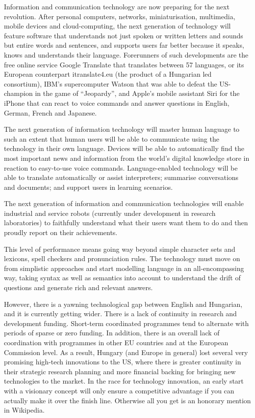 \begin{multicols}{2}
  Information and communication technology are now preparing for the next revolution. After personal computers, networks, miniaturisation, multimedia, mobile devices and cloud-computing, the next generation of technology will feature software that understands not just spoken or written letters and sounds but entire words and sentences, and supports users far better because it speaks, knows and understands their language. Forerunners of such developments are the free online service Google Translate that translates between 57 languages, or its European counterpart itranslate4.eu (the product of a Hungarian led consortium), IBM’s supercomputer Watson that was able to defeat the US-champion in the game of “Jeopardy”, and Apple’s mobile assistant Siri for the iPhone that can react to voice commands and answer questions in English, German, French and Japanese. 

  The next generation of information technology will master human language to such an extent that human users will be able to communicate using the technology in their own language. Devices will be able to automatically find the most important news and information from the world’s digital knowledge store in reaction to easy-to-use voice commands. Language-enabled technology will be able to translate automatically or assist interpreters; summarise conversations and documents;  and support users in learning scenarios. 

  The next generation of information and communication technologies will enable industrial and service robots (currently under development in research laboratories) to faithfully understand what their users want them to do and then proudly report on their achievements.  

  This level of performance means going way beyond simple character sets and lexicons, spell checkers and pronunciation rules. The technology must move on from simplistic approaches and start modelling language in an all-encompassing way, taking syntax as well as semantics into account to understand the drift of questions and generate rich and relevant answers.

  However, there is a yawning technological gap between English and Hungarian, and it is currently getting wider. There is a lack of continuity in research and development funding. Short-term coordinated programmes tend to alternate with periods of sparse or zero funding. In addition, there is an overall lack of coordination with programmes in other EU countries and at the European Commission level. As a result, Hungary (and Europe in general) lost several very promising high-tech innovations to the US, where there is greater continuity in their strategic research planning and more financial backing for bringing new technologies to the market. In the race for technology innovation, an early start with a visionary concept will only ensure a competitive advantage if you can actually make it over the finish line. Otherwise all you get is an honorary mention in Wikipedia.


\end{multicols}
